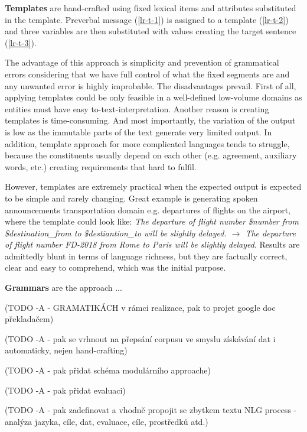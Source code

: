 \textbf{Templates} are hand-crafted using fixed lexical items and attributes substituted in the template. Preverbal message (\ref{lr-t-1}) is assigned to a template (\ref{lr-t-2}) and three variables are then substituted with values creating the target sentence (\ref{lr-t-3}). 

The advantage of this approach is simplicity and prevention of grammatical errors considering that we have full control of what the fixed segments are and any unwanted error is highly improbable. The disadvantages prevail. First of all, applying templates could be only feasible in a well-defined low-volume domains as entities must have easy to-text-interpretation. Another reason is creating templates is time-consuming. And most importantly, the variation of the output is low as the immutable parts of the text generate very limited output. In addition, template approach for more complicated languages tends to struggle, because the constituents usually depend on each other (e.g. agreement, auxiliary words, etc.) creating requirements that hard to fulfil. 

However, templates are extremely practical when the expected output is expected to be simple and 
rarely changing. Great example is generating spoken announcements transportation domain e.g. departures of flights on the airport, where the template could look like: \emph{The departure of flight number \$number from \$destination\_from to \$destiantion\_to will be slightly delayed. $\rightarrow$ The departure of flight number FD-2018 from Rome to Paris will be slightly delayed}. Results are admittedly blunt in terms of language richness, but they are factually correct, clear and easy to comprehend, which was the initial purpose.
     
\textbf{Grammars} are the approach ... 

(TODO  -A -  GRAMATIKÁCH v rámci realizace, pak to projet google doc překladačem)

(TODO  -A -  pak se vrhnout na přepsání corpusu ve smyslu získávání dat i automaticky, nejen hand-crafting)

(TODO  -A -  pak přidat schéma modulárního approache)

(TODO  -A -  pak přidat evaluaci)

(TODO  -A -  pak zadefinovat a vhodně propojit se zbytkem textu NLG process - analýza jazyka, cíle, dat, evaluace, cíle, prostředků atd.)
